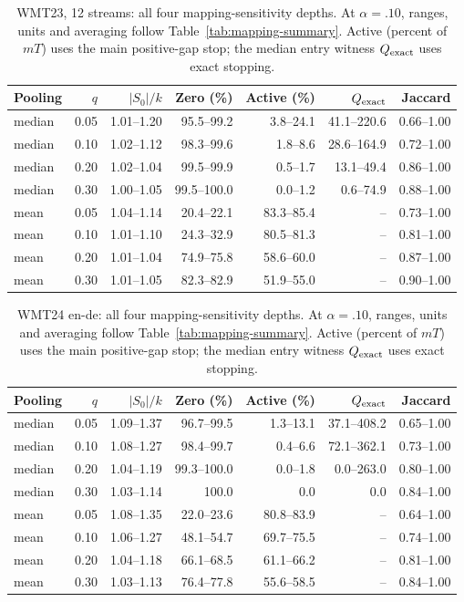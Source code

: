 \begin{table}[t]
\centering\small
\begin{tabular}{lrrrrrr}
\toprule
Pooling & $q$ & $|S_0|/k$ & Zero (\%) & Active (\%) & $Q_{\rm exact}$ & Jaccard \\
\midrule
median & 0.05 & 1.01--1.20 & 95.5--99.2 & 3.8--24.1 & 41.1--220.6 & 0.66--1.00 \\
median & 0.10 & 1.02--1.12 & 98.3--99.6 & 1.8--8.6 & 28.6--164.9 & 0.72--1.00 \\
median & 0.20 & 1.02--1.04 & 99.5--99.9 & 0.5--1.7 & 13.1--49.4 & 0.86--1.00 \\
median & 0.30 & 1.00--1.05 & 99.5--100.0 & 0.0--1.2 & 0.6--74.9 & 0.88--1.00 \\
mean & 0.05 & 1.04--1.14 & 20.4--22.1 & 83.3--85.4 & -- & 0.73--1.00 \\
mean & 0.10 & 1.01--1.10 & 24.3--32.9 & 80.5--81.3 & -- & 0.81--1.00 \\
mean & 0.20 & 1.01--1.04 & 74.9--75.8 & 58.6--60.0 & -- & 0.87--1.00 \\
mean & 0.30 & 1.01--1.05 & 82.3--82.9 & 51.9--55.0 & -- & 0.90--1.00 \\
\bottomrule
\end{tabular}
\caption{WMT23, 12 streams: all four mapping-sensitivity depths. At $\alpha=.10$, ranges, units and averaging follow Table~\ref{tab:mapping-summary}. Active (percent of $mT$) uses the main positive-gap stop; the median entry witness $Q_{\rm exact}$ uses exact stopping.}
\label{tab:mapping-all-2}
\end{table}

\begin{table}[t]
\centering\small
\begin{tabular}{lrrrrrr}
\toprule
Pooling & $q$ & $|S_0|/k$ & Zero (\%) & Active (\%) & $Q_{\rm exact}$ & Jaccard \\
\midrule
median & 0.05 & 1.09--1.37 & 96.7--99.5 & 1.3--13.1 & 37.1--408.2 & 0.65--1.00 \\
median & 0.10 & 1.08--1.27 & 98.4--99.7 & 0.4--6.6 & 72.1--362.1 & 0.73--1.00 \\
median & 0.20 & 1.04--1.19 & 99.3--100.0 & 0.0--1.8 & 0.0--263.0 & 0.80--1.00 \\
median & 0.30 & 1.03--1.14 & 100.0 & 0.0 & 0.0 & 0.84--1.00 \\
mean & 0.05 & 1.08--1.35 & 22.0--23.6 & 80.8--83.9 & -- & 0.64--1.00 \\
mean & 0.10 & 1.06--1.27 & 48.1--54.7 & 69.7--75.5 & -- & 0.74--1.00 \\
mean & 0.20 & 1.04--1.18 & 66.1--68.5 & 61.1--66.2 & -- & 0.81--1.00 \\
mean & 0.30 & 1.03--1.13 & 76.4--77.8 & 55.6--58.5 & -- & 0.84--1.00 \\
\bottomrule
\end{tabular}
\caption{WMT24 en-de: all four mapping-sensitivity depths. At $\alpha=.10$, ranges, units and averaging follow Table~\ref{tab:mapping-summary}. Active (percent of $mT$) uses the main positive-gap stop; the median entry witness $Q_{\rm exact}$ uses exact stopping.}
\label{tab:mapping-all-3}
\end{table}

